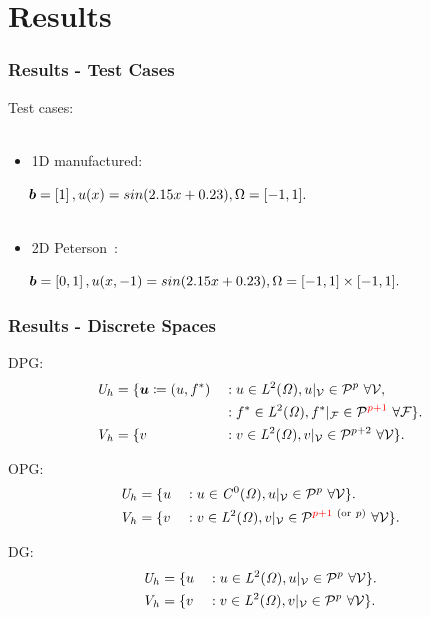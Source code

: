 \section{Results}

\begin{frame}
\frametitle{Results - Test Cases}

Test cases:
\\~

\begin{itemize}
  \item 1D manufactured:
\end{itemize}
$ \hspace{5mm} \mathit{\bm{{b}}} = \left[ 1 \right], u(x) = sin(2.15 x + 0.23), \Omega = [-1,1].$
\\~

\begin{itemize}
  \item 2D Peterson~\cite{Peterson1991}:
\end{itemize}
$ \hspace{5mm} \mathit{\bm{{b}}} = \left[ 0, 1 \right], u(x,-1) = sin(2.15 x + 0.23), \Omega = [-1,1] \times [-1,1].$

\end{frame}

\begin{frame}
\frametitle{Results - Discrete Spaces}

DPG:
\begin{alignat}{3}
& \fspace{U}_h = \{ \varv{u} \coloneqq (u,f^*) && : u \in \fspace{L}^2(\fspace{\Omega}), u|_{\fe{V}} \in \mathcal{P}^{p}\ \forall \fe{V}, \\
                                             &  && : f^* \in \fspace{L}^2(\fspace{\Omega}), f^*|_{\fe{F}} \in \mathcal{P}^\makered{p+1}\ \forall \fe{F} \}. \\
& \fspace{V}_h = \{ v && : v \in \fspace{L}^2(\fspace{\Omega}), v|_{\fe{V}} \in \mathcal{P}^{p+2}\ \forall \fe{V} \}.
\end{alignat}

OPG:
\begin{alignat}{3}
& \mathit{{{U}}}_h = \{ u && : u \in \mathit{{{C}}}^0(\mathit{{{\Omega}}}), u|_{\mathcal{{{V}}}} \in \mathcal{P}^{p}\ \forall \mathcal{{{V}}} \}. \\
& \mathit{{{V}}}_h = \{ v && : v \in \mathit{{{L}}}^2(\mathit{{{\Omega}}}), v|_{\mathcal{{{V}}}} \in \mathcal{P}^{{\color{red}p+1}\ (\text{or}\ p)}\ \forall \mathcal{{{V}}} \}.
\end{alignat}

DG:
\begin{alignat}{3}
& \mathit{{{U}}}_h = \{ u && : u \in \mathit{{{L}}}^2(\mathit{{{\Omega}}}), u|_{\mathcal{{{V}}}} \in \mathcal{P}^{p}\ \forall \mathcal{{{V}}} \}. \\
& \mathit{{{V}}}_h = \{ v && : v \in \mathit{{{L}}}^2(\mathit{{{\Omega}}}), v|_{\mathcal{{{V}}}} \in \mathcal{P}^{p}\ \forall \mathcal{{{V}}} \}.
\end{alignat}

\end{frame}


